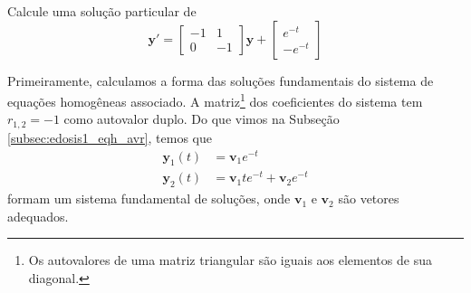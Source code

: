 \begin{exeresol}\label{exeresol:edosis1_eqnh_sp}
  Calcule uma solução particular de
  \begin{equation}
    \pmb{y}' =
    \begin{bmatrix}
      -1 & 1 \\
      0 & -1
    \end{bmatrix}\pmb{y} +
    \begin{bmatrix}
      e^{-t} \\
      -e^{-t}
    \end{bmatrix}
  \end{equation}
\end{exeresol}
\begin{resol}
  Primeiramente, calculamos a forma das soluções fundamentais do sistema de equações homogêneas associado. A matriz\footnote{Os autovalores de uma matriz triangular são iguais aos elementos de sua diagonal.} dos coeficientes do sistema tem $r_{1,2} = -1$ como autovalor duplo. Do que vimos na Subseção \ref{subsec:edosis1_eqh_avr}, temos que
  \begin{align}
    \pmb{y}_1(t) &= \pmb{v}_1e^{-t} \\
    \pmb{y}_2(t) &= \pmb{v}_1te^{-t} + \pmb{v}_2e^{-t}
  \end{align}
  formam um sistema fundamental de soluções, onde $\pmb{v}_1$ e $\pmb{v}_2$ são vetores adequados.


\end{resol}
